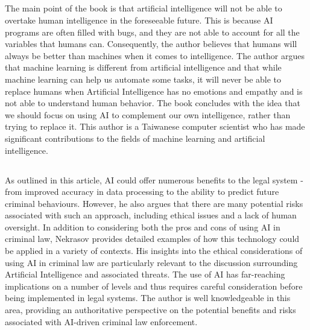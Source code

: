 \documentclass[12pt,letterpaper]{article}
\begin{document}
\subsection*{}
The main point of the book is that artificial intelligence will not be able to overtake human intelligence in the foreseeable future. This is because AI programs are often filled with bugs, and they are not able to account for all the variables that humans can. Consequently, the author believes that humans will always be better than machines when it comes to intelligence. The author argues that machine learning is different from artificial intelligence and that while machine learning can help us automate some tasks, it will never be able to replace humans when Artificial Intelligence has no emotions and empathy and is not able to understand human behavior. The book concludes with the idea that we should focus on using AI to complement our own intelligence, rather than trying to replace it. This author is a Taiwanese computer scientist who has made significant contributions to the fields of machine learning and artificial intelligence.


\subsection*{}
As outlined in this article, AI could offer numerous benefits to the legal system - from improved accuracy in data processing to the ability to predict future criminal behaviours. However, he also argues that there are many potential risks associated with such an approach, including ethical issues and a lack of human oversight. In addition to considering both the pros and cons of using AI in criminal law, Nekrasov provides detailed examples of how this technology could be applied in a variety of contexts. His insights into the ethical considerations of using AI in criminal law are particularly relevant to the discussion surrounding Artificial Intelligence and associated threats. The use of AI has far-reaching implications on a number of levels and thus requires careful consideration before being implemented in legal systems. The author is well knowledgeable in this area, providing an authoritative perspective on the potential benefits and risks associated with AI-driven criminal law enforcement.
\end{document}
